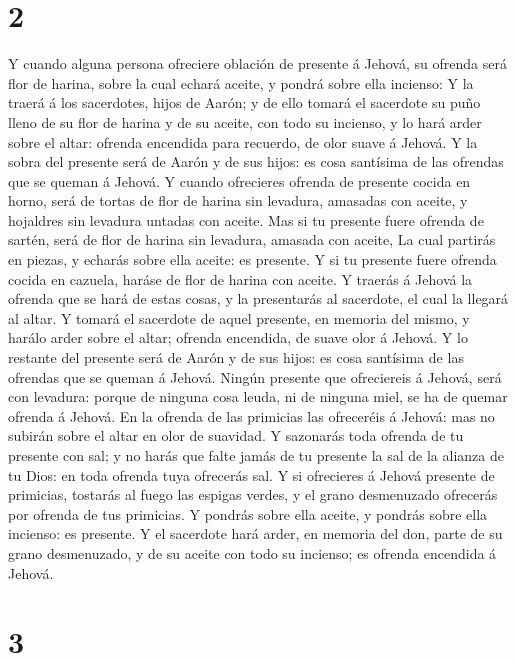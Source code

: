 \hypertarget{section-1}{%
\section{2}\label{section-1}}

 Y cuando alguna persona ofreciere oblación de presente á
Jehová, su ofrenda será flor de harina, sobre la cual echará aceite, y
pondrá sobre ella incienso:  Y la traerá á los sacerdotes,
hijos de Aarón; y de ello tomará el sacerdote su puño lleno de su flor
de harina y de su aceite, con todo su incienso, y lo hará arder sobre el
altar: ofrenda encendida para recuerdo, de olor suave á Jehová.
 Y la sobra del presente será de Aarón y de sus hijos: es
cosa santísima de las ofrendas que se queman á Jehová.  Y
cuando ofrecieres ofrenda de presente cocida en horno, será de tortas de
flor de harina sin levadura, amasadas con aceite, y hojaldres sin
levadura untadas con aceite.  Mas si tu presente fuere
ofrenda de sartén, será de flor de harina sin levadura, amasada con
aceite,  La cual partirás en piezas, y echarás sobre ella
aceite: es presente.  Y si tu presente fuere ofrenda cocida
en cazuela, haráse de flor de harina con aceite.  Y traerás
á Jehová la ofrenda que se hará de estas cosas, y la presentarás al
sacerdote, el cual la llegará al altar.  Y tomará el
sacerdote de aquel presente, en memoria del mismo, y harálo arder sobre
el altar; ofrenda encendida, de suave olor á Jehová.  Y lo
restante del presente será de Aarón y de sus hijos: es cosa santísima de
las ofrendas que se queman á Jehová.  Ningún presente que
ofreciereis á Jehová, será con levadura: porque de ninguna cosa leuda,
ni de ninguna miel, se ha de quemar ofrenda á Jehová.  En
la ofrenda de las primicias las ofreceréis á Jehová: mas no subirán
sobre el altar en olor de suavidad.  Y sazonarás toda
ofrenda de tu presente con sal; y no harás que falte jamás de tu
presente la sal de la alianza de tu Dios: en toda ofrenda tuya ofrecerás
sal.  Y si ofrecieres á Jehová presente de primicias,
tostarás al fuego las espigas verdes, y el grano desmenuzado ofrecerás
por ofrenda de tus primicias.  Y pondrás sobre ella aceite,
y pondrás sobre ella incienso: es presente.  Y el sacerdote
hará arder, en memoria del don, parte de su grano desmenuzado, y de su
aceite con todo su incienso; es ofrenda encendida á Jehová.

\hypertarget{section-2}{%
\section{3}\label{section-2}}

